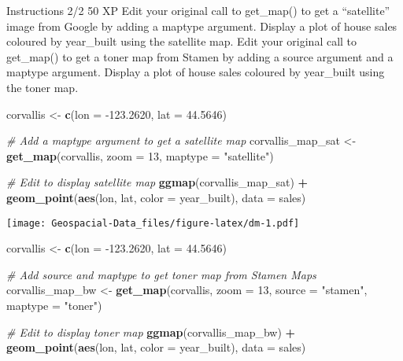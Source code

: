 \documentclass[]{article}
\newenvironment{Shaded}{\begin{snugshade}}{\end{snugshade}}
\newcommand{\CommentTok}[1]{\textcolor[rgb]{0.56,0.35,0.01}{\textit{#1}}}
\newcommand{\DataTypeTok}[1]{\textcolor[rgb]{0.13,0.29,0.53}{#1}}
\newcommand{\DecValTok}[1]{\textcolor[rgb]{0.00,0.00,0.81}{#1}}
\newcommand{\FloatTok}[1]{\textcolor[rgb]{0.00,0.00,0.81}{#1}}
\newcommand{\KeywordTok}[1]{\textcolor[rgb]{0.13,0.29,0.53}{\textbf{#1}}}
\newcommand{\NormalTok}[1]{#1}
\newcommand{\OperatorTok}[1]{\textcolor[rgb]{0.81,0.36,0.00}{\textbf{#1}}}
\newcommand{\StringTok}[1]{\textcolor[rgb]{0.31,0.60,0.02}{#1}}
\begin{document}
Instructions 2/2 50 XP Edit your original call to get\_map() to get a
``satellite'' image from Google by adding a maptype argument. Display a
plot of house sales coloured by year\_built using the satellite map.
Edit your original call to get\_map() to get a toner map from Stamen by
adding a source argument and a maptype argument. Display a plot of house
sales coloured by year\_built using the toner map.

\begin{Shaded}
\begin{Highlighting}[]
\NormalTok{corvallis <-}\StringTok{ }\KeywordTok{c}\NormalTok{(}\DataTypeTok{lon =} \FloatTok{-123.2620}\NormalTok{, }\DataTypeTok{lat =} \FloatTok{44.5646}\NormalTok{)}

\CommentTok{# Add a maptype argument to get a satellite map}
\NormalTok{corvallis_map_sat <-}\StringTok{ }\KeywordTok{get_map}\NormalTok{(corvallis, }\DataTypeTok{zoom =} \DecValTok{13}\NormalTok{, }\DataTypeTok{maptype =} \StringTok{"satellite"}\NormalTok{)}
 
 
\CommentTok{# Edit to display satellite map}
\KeywordTok{ggmap}\NormalTok{(corvallis_map_sat) }\OperatorTok{+}
\StringTok{  }\KeywordTok{geom_point}\NormalTok{(}\KeywordTok{aes}\NormalTok{(lon, lat, }\DataTypeTok{color =}\NormalTok{ year_built), }\DataTypeTok{data =}\NormalTok{ sales)}
\end{Highlighting}
\end{Shaded}

\texttt{[image: Geospacial-Data\_files/figure-latex/dm-1.pdf]}

\begin{Shaded}
\begin{Highlighting}[]
\NormalTok{corvallis <-}\StringTok{ }\KeywordTok{c}\NormalTok{(}\DataTypeTok{lon =} \FloatTok{-123.2620}\NormalTok{, }\DataTypeTok{lat =} \FloatTok{44.5646}\NormalTok{)}
 
\CommentTok{# Add source and maptype to get toner map from Stamen Maps}
\NormalTok{corvallis_map_bw <-}\StringTok{ }\KeywordTok{get_map}\NormalTok{(corvallis, }\DataTypeTok{zoom =} \DecValTok{13}\NormalTok{, }\DataTypeTok{source =} \StringTok{"stamen"}\NormalTok{, }\DataTypeTok{maptype =} \StringTok{"toner"}\NormalTok{)}

\CommentTok{# Edit to display toner map}
\KeywordTok{ggmap}\NormalTok{(corvallis_map_bw) }\OperatorTok{+}
\StringTok{  }\KeywordTok{geom_point}\NormalTok{(}\KeywordTok{aes}\NormalTok{(lon, lat, }\DataTypeTok{color =}\NormalTok{ year_built), }\DataTypeTok{data =}\NormalTok{ sales)}
\end{Highlighting}
\end{Shaded}
\end{document}
